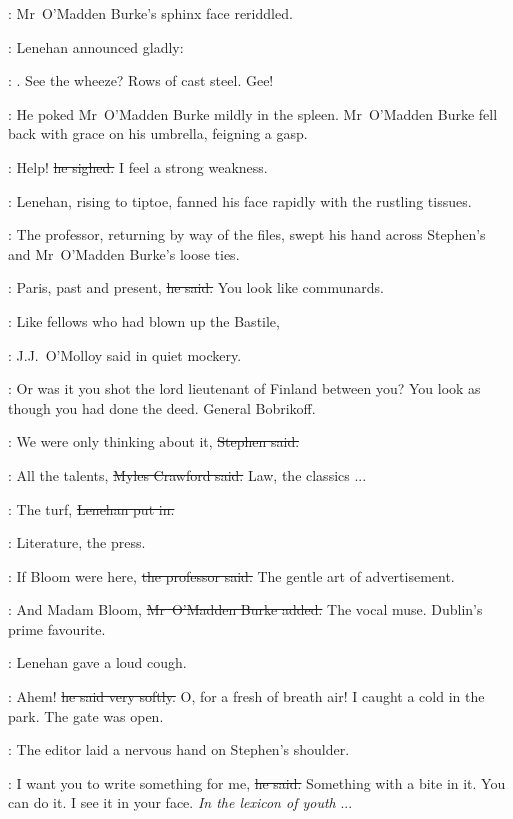 :
Mr~O'Madden Burke's sphinx face reriddled.

:
Lenehan announced gladly:

\lenehan:
.
See the wheeze?
Rows of cast steel.
Gee!

:
He poked Mr~O'Madden Burke mildly in the spleen.
Mr~O'Madden Burke fell back with grace on his umbrella,
feigning a gasp.

\omaddenburke:
Help!
\sout{he sighed.}
I feel a strong weakness.

:
Lenehan,
rising to tiptoe,
fanned his face rapidly with the rustling tissues.

:
The professor,
returning by way of the files,
swept his hand across Stephen's and Mr~O'Madden Burke's loose ties.

\machugh:
Paris, past and present,
\sout{he said.}
You look like communards.

\jjom:
Like fellows who had blown up the Bastile,

:
J.J.~O'Molloy said in quiet mockery.

\jjom:
Or was it you shot the lord lieutenant of Finland between you?
You look as though you had done the deed.
General Bobrikoff.



\Stephen:
We were only thinking about it,
\sout{Stephen said.}

\crawford:
All the talents,
\sout{Myles Crawford said.}
Law,
the classics ...

\lenehan:
The turf,
\sout{Lenehan put in.}

\crawford:
Literature,
the press.

\machugh:
If Bloom were here,
\sout{the professor said.}
The gentle art of advertisement.

\omaddenburke:
And Madam Bloom,
\sout{Mr~O'Madden Burke added.}
The vocal muse.
Dublin's prime favourite.

:
Lenehan gave a loud cough.

\lenehan:
Ahem!
\sout{he said very softly.}
O, for a fresh of breath air!
I caught a cold in the park.
The gate was open.



:
The editor laid a nervous hand on Stephen's shoulder.

\crawford:
I want you to write something for me,
\sout{he said.}
Something with a bite in it.
You can do it.
I see it in your face.
\emph{In the lexicon of youth} ...


